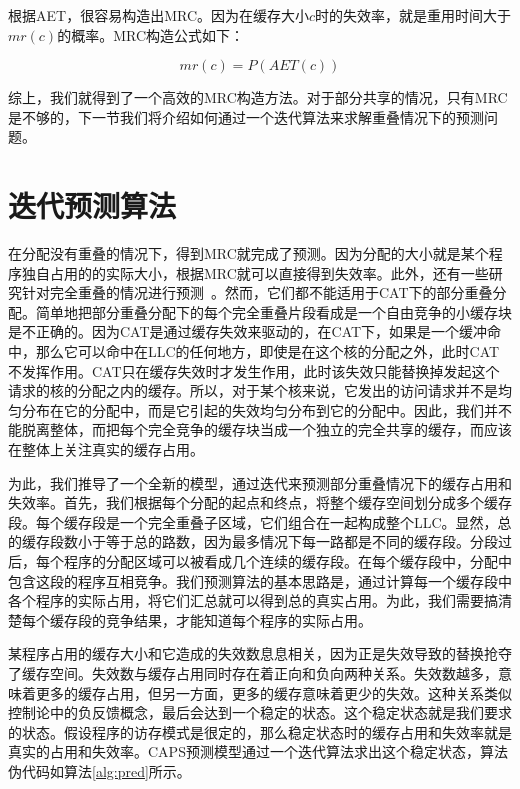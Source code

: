 根据AET，很容易构造出MRC。因为在缓存大小$c$时的失效率，就是重用时间大于$\textit{mr}(c)$的概率。MRC构造公式如下：

\begin{equation}
mr(c) = P(AET(c)) 
\label{eq:aet_mrr}
\end{equation}

综上，我们就得到了一个高效的MRC构造方法。对于部分共享的情况，只有MRC是不够的，下一节我们将介绍如何通过一个迭代算法来求解重叠情况下的预测问题。


\section{迭代预测算法} \label{sec:prediction_iteration}

在分配没有重叠的情况下，得到MRC就完成了预测。因为分配的大小就是某个程序独自占用的的实际大小，根据MRC就可以直接得到失效率。此外，还有一些研究针对完全重叠的情况进行预测~\parencite{chandra2005predicting, suh2014analytical, xiang2011all, xiang2011linear, hu2016kinect}。然而，它们都不能适用于CAT下的部分重叠分配。简单地把部分重叠分配下的每个完全重叠片段看成是一个自由竞争的小缓存块是不正确的。因为CAT是通过缓存失效来驱动的，在CAT下，如果是一个缓冲命中，那么它可以命中在LLC的任何地方，即使是在这个核的分配之外，此时CAT不发挥作用。CAT只在缓存失效时才发生作用，此时该失效只能替换掉发起这个请求的核的分配之内的缓存。所以，对于某个核来说，它发出的访问请求并不是均匀分布在它的分配中，而是它引起的失效均匀分布到它的分配中。因此，我们并不能脱离整体，而把每个完全竞争的缓存块当成一个独立的完全共享的缓存，而应该在整体上关注真实的缓存占用。

 为此，我们推导了一个全新的模型，通过迭代来预测部分重叠情况下的缓存占用和失效率。首先，我们根据每个分配的起点和终点，将整个缓存空间划分成多个缓存段。每个缓存段是一个完全重叠子区域，它们组合在一起构成整个LLC。显然，总的缓存段数小于等于总的路数，因为最多情况下每一路都是不同的缓存段。分段过后，每个程序的分配区域可以被看成几个连续的缓存段。在每个缓存段中，分配中包含这段的程序互相竞争。我们预测算法的基本思路是，通过计算每一个缓存段中各个程序的实际占用，将它们汇总就可以得到总的真实占用。为此，我们需要搞清楚每个缓存段的竞争结果，才能知道每个程序的实际占用。

 某程序占用的缓存大小和它造成的失效数息息相关，因为正是失效导致的替换抢夺了缓存空间。失效数与缓存占用同时存在着正向和负向两种关系。失效数越多，意味着更多的缓存占用，但另一方面，更多的缓存意味着更少的失效。这种关系类似控制论中的负反馈概念，最后会达到一个稳定的状态。这个稳定状态就是我们要求的状态。假设程序的访存模式是很定的，那么稳定状态时的缓存占用和失效率就是真实的占用和失效率。CAPS预测模型通过一个迭代算法求出这个稳定状态，算法伪代码如算法\ref{alg:pred}所示。

